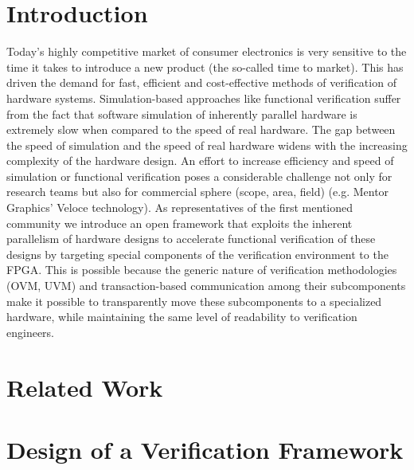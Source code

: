 \documentclass[draft]{llncs}
\begin{document}
\vspace*{-0mm}\section{Introduction}\vspace*{-0mm}
Today's highly competitive market of consumer electronics is very sensitive to the 
time it takes to introduce a new product (the so-called time to market). This has 
driven the demand for fast, efficient and cost-effective methods of verification 
of hardware systems. Simulation-based approaches like functional verification 
suffer from the fact that software simulation of inherently parallel hardware is 
extremely slow when compared to the speed of real hardware. The gap between the 
speed of simulation and the speed of real hardware widens with the increasing 
complexity of the hardware design. An effort to increase efficiency and speed of 
simulation or functional verification poses a considerable challenge not only for 
research teams but also for commercial sphere (scope, area, field) (e.g. Mentor 
Graphics' Veloce technology). As representatives of the first mentioned community 
we introduce an open framework that exploits the inherent parallelism of hardware 
designs to accelerate functional verification of these designs by targeting 
special components of the verification environment to the FPGA. This is possible 
because the generic nature of verification methodologies (OVM, UVM) and 
transaction-based communication among their subcomponents make it possible to 
transparently move these subcomponents to a specialized hardware, while 
maintaining the same level of readability to verification engineers.
\vspace*{-0mm}\section{Related Work}\vspace*{-0mm}


\vspace*{-0mm}\section{Design of a Verification Framework}\vspace*{-0mm}
\end{document}
